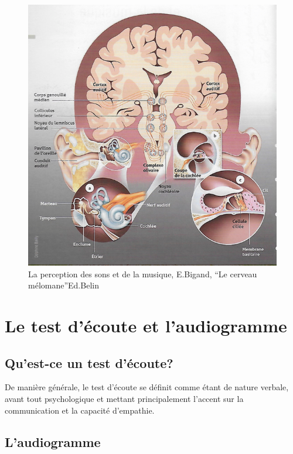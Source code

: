         \begin{figure}
	\centering
	\includegraphics[width=1\linewidth]{images/schemacerveauoreillebigand.png}
	\caption[Schéma du déroulement]{La perception des sons et de
          la musique, E.Bigand, ``Le cerveau mélomane''Ed.Belin}
       
	\label{cerveauoreillebigand1}
\end{figure}




\chapter{Le test d'écoute et l'audiogramme}

\section{Qu'est-ce un test d'écoute?}

De manière générale, le test d'écoute se  définit comme étant de nature verbale, avant tout 
psychologique et mettant principalement l'accent sur la communication
et la capacité d'empathie.





\section{L'audiogramme}

